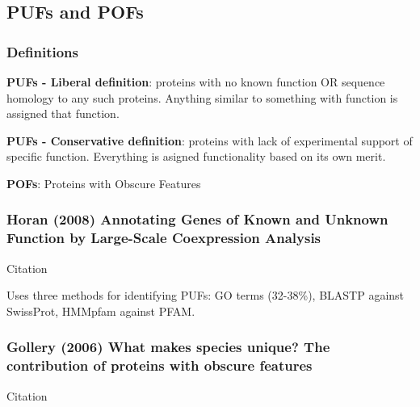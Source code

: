 \subsection{PUFs and POFs}

\subsubsection{Definitions}

    \textbf{PUFs - Liberal definition}: proteins with no known function OR
    sequence homology to any such proteins. Anything similar to something
    with function is assigned that function.

    \textbf{PUFs - Conservative definition}: proteins with lack of experimental
    support of specific function. Everything is asigned functionality based
    on its own merit.

    \textbf{POFs}: Proteins with Obscure Features

\subsubsection{Horan (2008) Annotating Genes of Known and Unknown Function
by Large-Scale Coexpression Analysis}

    Citation \cite{horan_annotating_2008}

    Uses three methods for identifying PUFs: GO terms (32-38\%), BLASTP
    against SwissProt, HMMpfam against PFAM.

\subsubsection{Gollery (2006) What makes species unique? The
contribution of proteins with obscure features}

    Citation \cite{gollery_what_2006}
